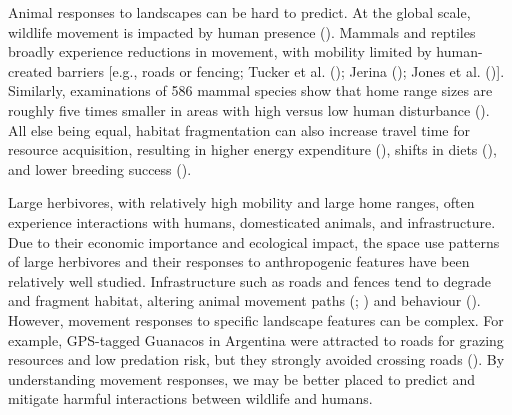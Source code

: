\documentclass[10pt,a4paper]{article}
\begin{document}
Animal responses to landscapes can be hard to predict.
At the global scale, wildlife movement is impacted by human presence ().
Mammals and reptiles broadly experience reductions in movement, with mobility limited by human-created barriers {[}e.g., roads or fencing; {Tucker et al.} (); Jerina (); Jones et al. (){]}.
Similarly, examinations of 586 mammal species show that home range sizes are roughly five times smaller in areas with high versus low human disturbance ().
All else being equal, habitat fragmentation can also increase travel time for resource acquisition, resulting in higher energy expenditure (), shifts in diets (), and lower breeding success ().

Large herbivores, with relatively high mobility and large home ranges, often experience interactions with humans, domesticated animals, and infrastructure.
Due to their economic importance and ecological impact, the space use patterns of large herbivores and their responses to anthropogenic features have been relatively well studied.
Infrastructure such as roads and fences tend to degrade and fragment habitat, altering animal movement paths (; ) and behaviour ().
However, movement responses to specific landscape features can be complex.
For example, GPS-tagged Guanacos in Argentina were attracted to roads for grazing resources and low predation risk, but they strongly avoided crossing roads ().
By understanding movement responses, we may be better placed to predict and mitigate harmful interactions between wildlife and humans.
\end{document}

